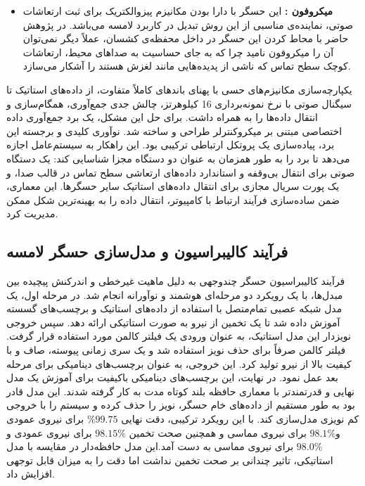 \begin{itemize}
	\item
	\textbf{میکروفون  :}
این حسگر با دارا بودن مکانیزم پیزوالکتریک برای ثبت ارتعاشات صوتی، نماینده‌ی مناسبی از این روش تبدیل در کاربرد لامسه می‌باشد. در پژوهش حاضر با محاط کردن این حسگر در داخل محفظه‌ی کشسان، عملاً دیگر نمی‌توان آن را میکروفون نامید چرا که به جای حساسیت به صدا‌های محیط، ارتعاشات کوچک سطح تماس که ناشی از پدیده‌هایی مانند لغزش هستند را آشکار می‌سازد.
\end{itemize}

یکپارچه‌سازی مکانیزم‌های حسی با پهنای باندهای کاملاً متفاوت، از داده‌های استاتیک تا سیگنال صوتی با نرخ نمونه‌برداری 16 کیلوهرتز، چالش جدی جمع‌آوری، همگام‌سازی و انتقال داده‌ها را به همراه داشت. برای حل این مشکل، یک برد جمع‌آوری داده اختصاصی مبتنی بر میکروکنترلر  طراحی و ساخته شد. نوآوری کلیدی و برجسته این برد، پیاده‌سازی یک پروتکل ارتباطی ترکیبی  بود. این راهکار به سیستم‌عامل اجازه می‌دهد تا برد را به طور همزمان به عنوان دو دستگاه مجزا شناسایی کند: یک دستگاه صوتی برای انتقال بی‌وقفه و استاندارد داده‌های ارتعاشی سطح تماس در قالب صدا، و یک پورت سریال مجازی برای انتقال داده‌های استاتیک سایر حسگرها. این معماری، ضمن ساده‌سازی فرآیند ارتباط با کامپیوتر، انتقال داده را به بهینه‌ترین شکل ممکن مدیریت کرد.

\subsection{فرآیند کالیبراسیون و مدل‌سازی حسگر لامسه}

فرآیند کالیبراسیون حسگر چندوجهی به دلیل ماهیت غیرخطی و اندرکنش پیچیده بین مبدل‌ها، با یک رویکرد دو مرحله‌ای هوشمند و نوآورانه انجام شد. در مرحله اول، یک مدل شبکه عصبی تمام‌متصل با استفاده از داده‌های استاتیک و برچسب‌های گسسته آموزش داده شد تا یک تخمین از نیرو به صورت استاتیکی ارائه دهد. سپس خروجی نویزدار این مدل استاتیک، به عنوان ورودی یک فیلتر کالمن مورد استفاده قرار گرفت. فیلتر کالمن صرفاً برای حذف نویز استفاده شد و یک سری زمانی پیوسته، صاف و با کیفیت بالا از نیرو تولید کرد. این خروجی، به عنوان برچسب‌های دینامیکی برای مرحله بعد عمل نمود. در نهایت، این برچسب‌های دینامیکی باکیفیت برای آموزش یک مدل نهایی و قدرتمندتر با معماری حافظه بلند کوتاه مدت به کار گرفته شدند. این مدل قادر بود به طور مستقیم از داده‌های خام حسگر، نویز را حذف کرده و سیستم را با خروجی کم نویزی مدل‌سازی کند. با این رویکرد ترکیبی، دقت نهایی
 $\%99.75$ 
 برای نیروی عمودی و$98.1\%$ برای نیروی مماسی و همچنین صحت تخمین $98.15\%$ برای نیروی عمودی و $98.0\%$ برای نیروی مماسی به دست آمد.این مدل حافظه‌دار در مقایسه با مدل استاتیکی، تاثیر چندانی بر صحت تخمین نداشت اما دقت را به میزان قابل توجهی افزایش داد.

